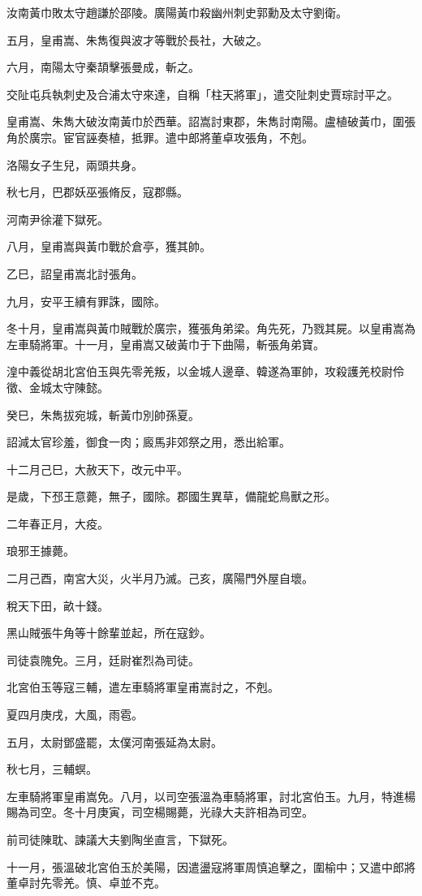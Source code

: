 \begin{pinyinscope}
汝南黃巾敗太守趙謙於邵陵。廣陽黃巾殺幽州刺史郭勳及太守劉衛。

五月，皇甫嵩、朱雋復與波才等戰於長社，大破之。

六月，南陽太守秦頡擊張曼成，斬之。

交阯屯兵執刺史及合浦太守來達，自稱「柱天將軍」，遣交阯刺史賈琮討平之。

皇甫嵩、朱雋大破汝南黃巾於西華。詔嵩討東郡，朱雋討南陽。盧植破黃巾，圍張角於廣宗。宦官誣奏植，抵罪。遣中郎將董卓攻張角，不剋。

洛陽女子生兒，兩頭共身。

秋七月，巴郡妖巫張脩反，寇郡縣。

河南尹徐灌下獄死。

八月，皇甫嵩與黃巾戰於倉亭，獲其帥。

乙巳，詔皇甫嵩北討張角。

九月，安平王續有罪誅，國除。

冬十月，皇甫嵩與黃巾賊戰於廣宗，獲張角弟梁。角先死，乃戮其屍。以皇甫嵩為左車騎將軍。十一月，皇甫嵩又破黃巾于下曲陽，斬張角弟寶。

湟中義從胡北宮伯玉與先零羌叛，以金城人邊章、韓遂為軍帥，攻殺護羌校尉伶徵、金城太守陳懿。

癸巳，朱雋拔宛城，斬黃巾別帥孫夏。

詔減太官珍羞，御食一肉；廄馬非郊祭之用，悉出給軍。

十二月己巳，大赦天下，改元中平。

是歲，下邳王意薨，無子，國除。郡國生異草，備龍蛇鳥獸之形。

二年春正月，大疫。

琅邪王據薨。

二月己酉，南宮大災，火半月乃滅。己亥，廣陽門外屋自壞。

稅天下田，畝十錢。

黑山賊張牛角等十餘輩並起，所在寇鈔。

司徒袁隗免。三月，廷尉崔烈為司徒。

北宮伯玉等寇三輔，遣左車騎將軍皇甫嵩討之，不剋。

夏四月庚戌，大風，雨雹。

五月，太尉鄧盛罷，太僕河南張延為太尉。

秋七月，三輔螟。

左車騎將軍皇甫嵩免。八月，以司空張溫為車騎將軍，討北宮伯玉。九月，特進楊賜為司空。冬十月庚寅，司空楊賜薨，光祿大夫許相為司空。

前司徒陳耽、諫議大夫劉陶坐直言，下獄死。

十一月，張溫破北宮伯玉於美陽，因遣盪寇將軍周慎追擊之，圍榆中；又遣中郎將董卓討先零羌。慎、卓並不克。


\end{pinyinscope}
